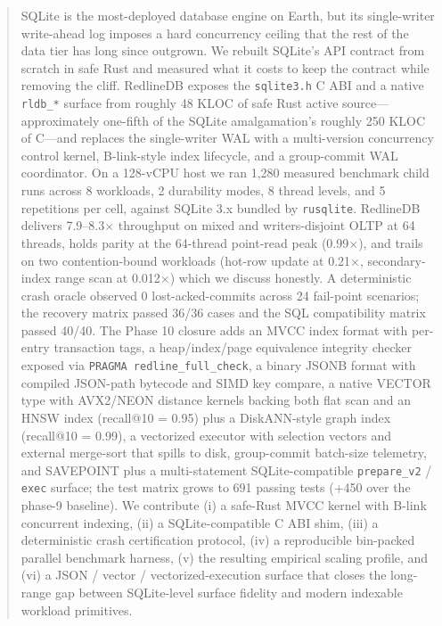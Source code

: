 \begin{abstract}
SQLite is the most-deployed database engine on Earth, but its
single-writer write-ahead log imposes a hard concurrency ceiling that
the rest of the data tier has long since outgrown. We rebuilt SQLite's
API contract from scratch in safe Rust and measured what it costs to
keep the contract while removing the cliff. RedlineDB exposes the
\texttt{sqlite3.h} C ABI and a native \texttt{rldb\_*} surface from
roughly 48 KLOC of safe Rust active source---approximately one-fifth
of the SQLite amalgamation's roughly 250 KLOC of C---and replaces the
single-writer WAL with a multi-version concurrency control kernel,
B-link-style index lifecycle, and a group-commit WAL coordinator. On a
128-vCPU host we ran 1{,}280 measured benchmark child runs across
8 workloads, 2 durability modes, 8 thread levels, and 5 repetitions per
cell, against SQLite 3.x bundled by \texttt{rusqlite}. RedlineDB
delivers 7.9--8.3$\times$ throughput on mixed and writers-disjoint
OLTP at 64 threads, holds parity at the 64-thread point-read peak
(0.99$\times$), and trails on two contention-bound workloads
(hot-row update at 0.21$\times$, secondary-index range scan at
0.012$\times$) which we discuss honestly. A deterministic crash
oracle observed 0 lost-acked-commits across 24 fail-point scenarios;
the recovery matrix passed 36/36 cases and the SQL compatibility
matrix passed 40/40. The Phase 10 closure adds an MVCC index format
with per-entry transaction tags, a heap/index/page equivalence
integrity checker exposed via \texttt{PRAGMA redline\_full\_check}, a
binary JSONB format with compiled JSON-path bytecode and SIMD key
compare, a native VECTOR type with AVX2/NEON distance kernels backing
both flat scan and an HNSW index (recall@10 = 0.95) plus a DiskANN-style
graph index (recall@10 = 0.99), a vectorized executor with selection
vectors and external merge-sort that spills to disk, group-commit
batch-size telemetry, and SAVEPOINT plus a multi-statement
SQLite-compatible \texttt{prepare\_v2} / \texttt{exec} surface; the
test matrix grows to 691 passing tests (+450 over the phase-9
baseline). We contribute (i) a safe-Rust MVCC kernel with B-link
concurrent indexing, (ii) a SQLite-compatible C ABI shim, (iii)
a deterministic crash certification protocol, (iv) a reproducible
bin-packed parallel benchmark harness, (v) the resulting empirical
scaling profile, and (vi) a JSON / vector / vectorized-execution
surface that closes the long-range gap between SQLite-level surface
fidelity and modern indexable workload primitives.
\end{abstract}
